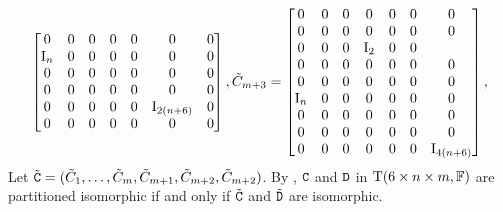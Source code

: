 \begin{example}
\begin{equation}
\begin{bmatrix}
	0 & 0 & 0 & 0 & 0 & 0 &0 \\
	\mathrm{I}_n & 0 & 0 & 0 & 0 & 0 &0\\
	0 & 0 & 0 & 0 & 0 & 0 &0\\
	0 & 0 & 0 & 0 & 0 & 0&0 \\
	0 & 0 & 0 & 0 & 0 & \mathrm{I}_{2(n+6)} &0\\
	0 & 0 & 0 & 0 & 0 & 0 &0
\end{bmatrix},
\tilde C_{m+3}=\begin{bmatrix}
	0 & 0 & 0 & 0 & 0 &0 & 0 \\
	0 & 0 & 0 & 0 & 0 &0 & 0\\
	0 & 0 & 0 & \mathrm{I}_2 & 0  &0 \\
	0 & 0 & 0 & 0 & 0 &0 & 0 \\
	0 & 0 & 0 & 0 & 0 &0 & 0\\
	\mathrm{I}_n & 0 & 0 & 0 & 0 & 0 &0\\
	0 & 0 & 0 & 0 & 0&0 & 0 \\
	0 & 0 & 0 & 0 & 0 &0 & 0\\
	0 & 0 & 0 & 0 & 0 &0 &  \mathrm{I}_{4(n+6)}
\end{bmatrix},
\end{equation}
Let $\tilde{\mathtt{C}}=(\tilde C_1, \dots, \tilde C_m, \tilde C_{m+1}, \tilde C_{m+2}, \tilde C_{m+2})$. By \cite{TI4}, $\mathtt{C}$ and $\mathtt{D}$ in $\mathrm{T}(6\times n\times m, \mathbb{F})$ are partitioned isomorphic if and only if $\tilde{\mathtt{C}}$ and $\tilde{\mathtt{D}}$ are isomorphic. 


\end{example}
